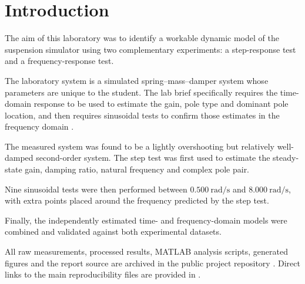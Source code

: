 \documentclass[12pt,a4paper]{article}
\begin{document}
\listoffigures

\clearpage

{}

\listoftables

\clearpage


\setcounter{page}{1}


\section{Introduction}
\label{sec:intro}

The aim of this laboratory was to identify a workable dynamic model
of the suspension simulator using two complementary experiments:
a step-response test and a frequency-response test.

The laboratory system is a simulated spring--mass--damper system
whose parameters are unique to the student. The lab brief
specifically requires the time-domain response to be used to
estimate the gain, pole type and dominant pole location, and then
requires sinusoidal tests to confirm those estimates in the
frequency domain \cite{labbrief}.

The measured system was found to be a lightly overshooting but
relatively well-damped second-order system. The step test was first
used to estimate the steady-state gain, damping ratio, natural
frequency and complex pole pair.

Nine sinusoidal tests were then performed between
$0.500~\mathrm{rad/s}$ and $8.000~\mathrm{rad/s}$, with extra points
placed around the frequency predicted by the step test.

Finally, the independently estimated time- and frequency-domain
models were combined and validated against both experimental
datasets.

All raw measurements, processed results, MATLAB analysis scripts,
generated figures and the report source are archived in the public
project repository \cite{githubrepo}. Direct links to the main
reproducibility files are provided in .

\end{document}
